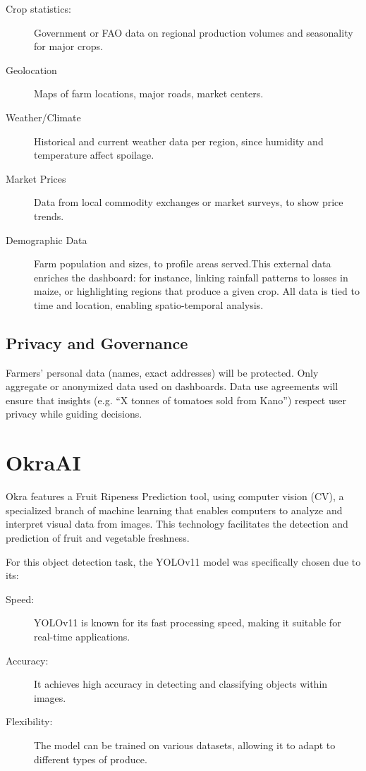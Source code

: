 {\begin{description}
    \item[Crop statistics:]  Government or FAO data on regional production volumes and seasonality for major crops.
    
    \item[Geolocation] Maps of farm locations, major roads, market centers.
    
    \item[Weather/Climate] Historical and current weather data per region, since humidity and temperature affect spoilage.
    \item[Market Prices]  Data from local commodity exchanges or market surveys, to show price trends.
    \item[Demographic Data] Farm population and sizes, to profile areas served.This external data enriches the dashboard: for instance, linking rainfall patterns to losses in maize, or highlighting regions that produce a given crop. All data is tied to time and location, enabling spatio-temporal analysis.
\end{description}

\subsection{Privacy and Governance}
Farmers’ personal data (names, exact addresses) will be protected. Only aggregate or anonymized data used on dashboards. Data use agreements will ensure that insights (e.g. “X tonnes of tomatoes sold from Kano”) respect user privacy while guiding decisions.


\section{OkraAI}
Okra features a Fruit Ripeness Prediction tool, using computer vision (CV), a specialized branch of machine learning that enables computers to analyze and interpret visual data from images. This technology facilitates the detection and prediction of fruit and vegetable freshness.

For this object detection task, the YOLOv11 model was specifically chosen due to its:

\begin{description}
    \item[Speed:] YOLOv11 is known for its fast processing speed, making it suitable for real-time applications.
    \item[Accuracy:] It achieves high accuracy in detecting and classifying objects within images.
    \item[Flexibility:] The model can be trained on various datasets, allowing it to adapt to different types of produce.
\end{description}



}
